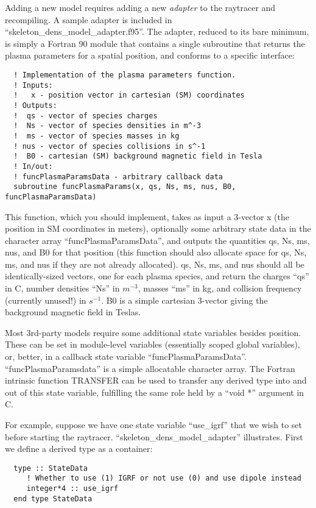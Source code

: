 \documentclass[10pt]{article}
\begin{document}
Adding a new model requires adding a new {\em adapter} to the
raytracer and recompiling.  A sample adapter is included in
``skeleton\_dens\_model\_adapter.f95''.  The adapter, reduced to its
bare minimum, is simply a Fortran 90 module that contains a single
subroutine that returns the plasma parameters for a spatial position,
and conforms to a specific interface:

\begin{verbatim}
  ! Implementation of the plasma parameters function.
  ! Inputs:
  !   x - position vector in cartesian (SM) coordinates
  ! Outputs:
  !  qs - vector of species charges
  !  Ns - vector of species densities in m^-3
  !  ms - vector of species masses in kg
  ! nus - vector of species collisions in s^-1
  !  B0 - cartesian (SM) background magnetic field in Tesla
  ! In/out:
  ! funcPlasmaParamsData - arbitrary callback data 
  subroutine funcPlasmaParams(x, qs, Ns, ms, nus, B0, funcPlasmaParamsData)
\end{verbatim}

This function, which you should implement, takes as input a 3-vector x
(the position in SM coordinates in meters), optionally some arbitrary
state data in the character array ``funcPlasmaParamsData'', and
outputs the quantities qs, Ns, ms, nus, and B0 for that position (this
function should also allocate space for qs, Ns, ms, and nus if they
are not already allocated).  qs, Ns, ms, and nus should all be
identically-sized vectors, one for each plasma species, and return the
charges ``qs'' in C, number densities ``Ns'' in $m^{-3}$, masses
``ms'' in kg, and collision frequency (currently unused!) in $s^{-1}$.
B0 is a simple cartesian 3-vector giving the background magnetic field
in Teslas.

Most 3rd-party models require some additional state variables besides
position.  These can be set in module-level variables (essentially
scoped global variables), or, better, in a callback state variable
``funcPlasmaParamsData''.  ``funcPlasmaParamsdata'' is a simple
allocatable character array.  The Fortran intrinsic function TRANSFER
can be used to transfer any derived type into and out of this state
variable, fulfilling the same role held by a ``void *'' argument in C.

For example, suppose we have one state variable ``use\_igrf'' that we
wish to set before starting the raytracer.
``skeleton\_dens\_model\_adapter'' illustrates.  First we define a
derived type as a container:
\begin{verbatim}
  type :: StateData
     ! Whether to use (1) IGRF or not use (0) and use dipole instead
     integer*4 :: use_igrf
  end type StateData
\end{verbatim}
\end{document}
